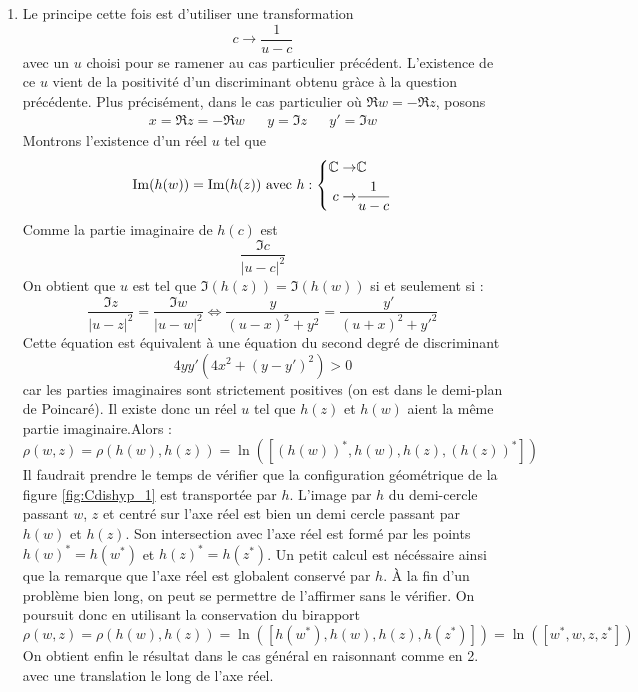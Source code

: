 \begin{enumerate}
\item Le principe cette fois est d'utiliser une transformation 
\begin{displaymath}
 c \rightarrow \dfrac{1}{u-c}
\end{displaymath}
avec un $u$ choisi pour se ramener au cas particulier précédent. L'existence de ce $u$ vient de la positivité d'un discriminant obtenu gràce à la question précédente.\newline
Plus précisément, dans le cas particulier où $\Re w = -\Re z$, posons
\begin{align*}
 x=\Re z = -\Re w & & y=\Im z & & y'=\Im w
\end{align*}
Montrons l'existence d'un réel $u$ tel que
\begin{displaymath}
 \operatorname{Im} (h(w)) = \operatorname{Im} (h(z)) \text{ avec }
h :\left\lbrace 
\begin{aligned}
 \mathbb{C} \rightarrow& \mathbb{C} \\
c \rightarrow& \dfrac{1}{u-c}
\end{aligned}
\right. 
\end{displaymath}
Comme la partie imaginaire de $h(c)$ est
\begin{displaymath}
 \dfrac{\Im c}{|u-c|^2}
\end{displaymath}
On obtient que $u$ est tel que $\Im(h(z))=\Im(h(w))$ si et seulement si :
\begin{displaymath}
 \dfrac{\Im z}{|u-z|^2} = \dfrac{\Im w}{|u-w|^2}
\Leftrightarrow
 \dfrac{y}{(u-x)^2+y^2} = \dfrac{y'}{(u+x)^2+y'^2}
\end{displaymath}
Cette équation est équivalent à une équation du second degré de discriminant
\begin{displaymath}
 4yy'(4x^2+(y-y')^2) > 0
\end{displaymath}
car les parties imaginaires sont strictement positives (on est dans le demi-plan de Poincaré). Il existe donc un réel $u$ tel que $h(z)$ et $h(w)$ aient la même partie imaginaire.Alors :
\begin{displaymath}
\rho(w,z)=\rho(h(w),h(z))=\ln([(h(w))^*,h(w),h(z),(h(z))^*]) 
\end{displaymath}
Il faudrait prendre le temps de vérifier que la configuration géométrique de la figure \ref{fig:Cdishyp_1} est transportée par $h$. L'image par $h$ du demi-cercle passant $w$, $z$ et centré sur l'axe réel est bien un demi cercle passant par $h(w)$ et $h(z)$. Son intersection avec l'axe réel est formé par les points $h(w)^*=h(w^*)$ et $h(z)^*=h(z^*)$. Un petit calcul est nécéssaire ainsi que la remarque que l'axe réel est globalent conservé par $h$. À la fin d'un problème bien long, on peut se permettre de l'affirmer sans le vérifier.\newline
On  poursuit donc en utilisant la conservation du birapport
\begin{displaymath}
\rho(w,z)=\rho(h(w),h(z))=\ln([h(w^*),h(w),h(z),h(z^*)])
=\ln([w^*,w,z,z^*])
\end{displaymath}
On obtient enfin le résultat dans le cas général en raisonnant comme en 2. avec une translation le long de l'axe réel.

\end{enumerate}
